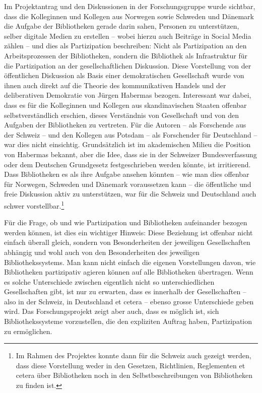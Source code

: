 \documentclass[a4paper,
fontsize=11pt,
oneside,
numbers=noperiodatend,
parskip=half-,
bibliography=totoc,
final
]{scrartcl}
\begin{document}
Im Projektantrag und den Diskussionen in der Forschungsgruppe wurde
sichtbar, dass die Kolleginnen und Kollegen aus Norwegen sowie Schweden
und Dänemark die Aufgabe der Bibliotheken gerade darin sahen, Personen
zu unterstützen, selber digitale Medien zu erstellen -- wobei hierzu
auch Beiträge in Social Media zählen -- und dies als Partizipation
beschreiben: Nicht als Partizipation an den Arbeitsprozessen der
Bibliotheken, sondern die Bibliothek als Infrastruktur für die
Partizipation an der gesellschaftlichen Diskussion. Diese Vorstellung
von der öffentlichen Diskussion als Basis einer demokratischen
Gesellschaft wurde von ihnen auch direkt auf die Theorie des
kommunikativen Handels und der deliberativen Demokratie von Jürgen
Habermas bezogen. Interessant war dabei, dass es für die Kolleginnen und
Kollegen aus skandinavischen Staaten offenbar selbstverständlich
erschien, dieses Verständnis von Gesellschaft und von den Aufgaben der
Bibliotheken zu vertreten. Für die Autoren -- als Forschende aus der
Schweiz -- und den Kollegen aus Potsdam -- als Forschender für
Deutschland -- war dies nicht einsichtig. Grundsätzlich ist im
akademischen Milieu die Position von Habermas bekannt, aber die Idee,
dass sie in der Schweizer Bundesverfassung oder dem Deutschen
Grundgesetz festgeschrieben werden könnte, ist irritierend. Dass
Bibliotheken es als ihre Aufgabe ansehen könnten -- wie man dies
offenbar für Norwegen, Schweden und Dänemark voraussetzen kann -- die
öffentliche und freie Diskussion aktiv zu unterstützen, war für die
Schweiz und Deutschland auch schwer vorstellbar.\footnote{Im Rahmen des
  Projektes konnte dann für die Schweiz auch gezeigt werden, dass diese
  Vorstellung weder in den Gesetzen, Richtlinien, Reglementen et cetera
  über Bibliotheken noch in den Selbstbeschreibungen von Bibliotheken zu
  finden ist.}

Für die Frage, ob und wie Partizipation und Bibliotheken aufeinander
bezogen werden können, ist dies ein wichtiger Hinweis: Diese Beziehung
ist offenbar nicht einfach überall gleich, sondern von Besonderheiten
der jeweiligen Gesellschaften abhängig und wohl auch von den
Besonderheiten des jeweiligen Bibliothekssystems. Man kann nicht einfach
die eigenen Vorstellungen davon, wie Bibliotheken partizipativ agieren
können auf alle Bibliotheken übertragen. Wenn es solche Unterschiede
zwischen eigentlich nicht so unterschiedlichen Gesellschaften gibt, ist
nur zu erwarten, dass es innerhalb der Gesellschaften -- also in der
Schweiz, in Deutschland et cetera -- ebenso grosse Unterschiede geben
wird. Das Forschungsprojekt zeigt aber auch, dass es möglich ist, sich
Bibliothekssysteme vorzustellen, die den expliziten Auftrag haben,
Partizipation zu ermöglichen.
\end{document}
